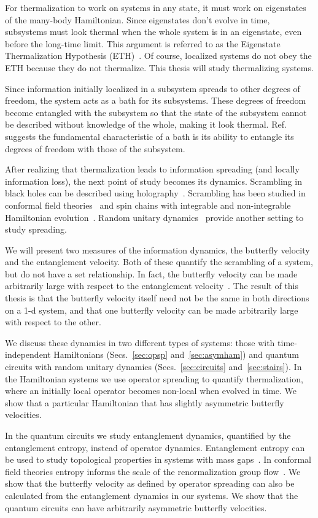 For thermalization to work on systems in any state, it must work on eigenstates of the many-body Hamiltonian. Since eigenstates don't evolve in time, subsystems must look thermal when the whole system is in an eigenstate, even before the long-time limit. This argument is referred to as the Eigenstate Thermalization Hypothesis (ETH)~\cite{Deutsch91, Srednicki1994, Rigol2008, Nandkishore2015}. Of course, localized systems do not obey the ETH because they do not thermalize. This thesis will study thermalizing systems.

Since information initially localized in a subsystem spreads to other degrees of freedom, the system acts as a bath for its subsystems. These degrees of freedom become entangled with the subsystem so that the state of the subsystem cannot be described without knowledge of the whole, making it look thermal. Ref.~\cite{Nandkishore2015} suggests the fundamental characteristic of a bath is its ability to entangle its degrees of freedom with those of the subsystem.

After realizing that thermalization leads to information spreading (and locally information loss), the next point of study becomes its dynamics. Scrambling in black holes can be described using holography~\cite{Sekino2008, Shenker2014}. Scrambling has been studied in conformal field theories~\cite{Calabrese2005} and spin chains with integrable and non-integrable Hamiltonian evolution~\cite{Fagotti2008, Luchli2008, Kim2013, Baradson2012}. Random unitary dynamics~\cite{Keyserlingk, Nahum2017,Nahum2017q,Nahum2018,Jonay18} provide another setting to study spreading.

We will present two measures of the information dynamics, the butterfly velocity and the entanglement velocity. Both of these quantify the scrambling of a system, but do not have a set relationship. In fact, the butterfly velocity can be made arbitrarily large with respect to the entanglement velocity~\cite{Nahum2018}. The result of this thesis is that the butterfly velocity itself need not be the same in both directions on a 1-d system, and that one butterfly velocity can be made arbitrarily large with respect to the other.

We discuss these dynamics in two different types of systems: those with time-independent Hamiltonians (Secs.~\ref{sec:opsp} and~\ref{sec:asymham}) and quantum circuits with random unitary dynamics (Secs.~\ref{sec:circuits} and~\ref{sec:stairs}). In the Hamiltonian systems we use operator spreading to quantify thermalization, where an initially local operator becomes non-local when evolved in time. We show that a particular Hamiltonian that has slightly asymmetric butterfly velocities.

In the quantum circuits we study entanglement dynamics, quantified by the entanglement entropy, instead of operator dynamics. Entanglement entropy can be used to study topological properties in systems with mass gaps~\cite{Kitaev2006}. In conformal field theories entropy informs the scale of the renormalization group flow~\cite{Casini2011, Myers2011}.
We show that the butterfly velocity as defined by operator spreading can also be calculated from the entanglement dynamics in our systems. We show that the quantum circuits can have arbitrarily asymmetric butterfly velocities. 
